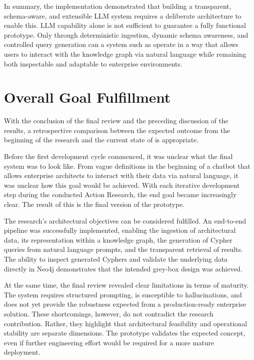 In summary, the implementation demonstrated that building a transparent, schema-aware, and extensible LLM system requires a deliberate architecture to enable this. LLM capability alone is not sufficient to guarantee a fully functional prototype. Only through deterministic ingestion, dynamic schema awareness, and controlled query generation can a system such as \prototype{} operate in a way that allows users to interact with the knowledge graph via natural language while remaining both inspectable and adaptable to enterprise environments.

\section{Overall Goal Fulfillment}
\label{sub:overallGoalFulfillment}
With the conclusion of the final review and the preceding discussion of the results, a retrospective comparison between the expected outcome from the beginning of the research and the current state of \prototype{}  is appropriate.

Before the first development cycle commenced, it was unclear what the final system was to look like. From vague definitions in the beginning of a chatbot that allows enterprise architects to interact with their data via natural language, it was unclear how this goal would be achieved. With each iterative development step during the conducted Action Research, the end goal became increasingly clear. The result of this is the final version of the prototype.

The research's architectural objectives can be considered fulfilled. An end-to-end pipeline was successfully implemented, enabling the ingestion of architectural data, its representation within a knowledge graph, the generation of Cypher queries from natural language prompts, and the transparent retrieval of results. The ability to inspect generated Cyphers and validate the underlying data directly in Neo4j demonstrates that the intended grey-box design was achieved.

At the same time, the final review revealed clear limitations in terms of maturity. The system requires structured prompting, is susceptible to hallucinations, and does not yet provide the robustness expected from a production-ready enterprise solution. These shortcomings, however, do not contradict the research contribution. Rather, they highlight that architectural feasibility and operational stability are separate dimensions. The prototype validates the expected concept, even if further engineering effort would be required for a more mature deployment.

